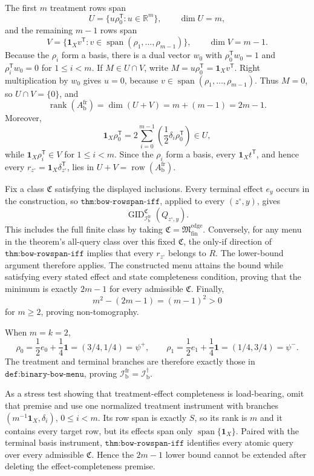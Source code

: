 The first \(m\) treatment rows span
\[
U=\{u\rho_0^{\mathsf T}:u\in\mathbb R^m\},
\qquad \dim U=m,
\]
and the remaining \(m-1\) rows span
\[
V=\{\mathbf 1_Xv^{\mathsf T}:v\in\operatorname{span}(\rho_1,\ldots,\rho_{m-1})\},
\qquad \dim V=m-1.
\]
Because the \(\rho_i\) form a basis, there is a dual vector \(w_0\) with \(\rho_0^{\mathsf T}w_0=1\) and \(\rho_i^{\mathsf T}w_0=0\) for \(1\leq i<m\).  If \(M\in U\cap V\), write \(M=u\rho_0^{\mathsf T}=\mathbf 1_Xv^{\mathsf T}\).  Right multiplication by \(w_0\) gives \(u=0\), because \(v\in\operatorname{span}(\rho_1,\ldots,\rho_{m-1})\).  Thus \(M=0\), so \(U\cap V=\{0\}\), and
\[
\operatorname{rank}(A_{\mathrm b}^{\mathrm{fr}})
=\dim(U+V)=m+(m-1)=2m-1.
\]
Moreover,
\[
\mathbf 1_X\rho_0^{\mathsf T}
=2\sum_{i=0}^{m-1}\left(\frac12\delta_i\rho_0^{\mathsf T}\right)\in U,
\]
while \(\mathbf 1_X\rho_i^{\mathsf T}\in V\) for \(1\leq i<m\).  Since the \(\rho_i\) form a basis, every \(\mathbf 1_Xt^{\mathsf T}\), and hence every \(r_{z^{\circ}}=\mathbf 1_X\delta_{z^{\circ}}^{\mathsf T}\), lies in \(U+V=\operatorname{row}(A_{\mathrm b}^{\mathrm{fr}})\).

Fix a class \(\mathfrak C\) satisfying the displayed inclusions.  Every terminal effect \(e_y\) occurs in the construction, so \(\texttt{thm:bow-rowspan-iff}\), applied to every \((z^{\circ},y)\), gives
\[
\operatorname{GID}_{\mathcal I_{\mathrm b}^{\mathrm{fr}}}^{\mathfrak C}(Q_{z^{\circ},y}).
\]
This includes the full finite class by taking \(\mathfrak C=\mathfrak M_{\mathrm{fin}}^{\mathrm{edge}}\).  Conversely, for any menu in the theorem's all-query class over this fixed \(\mathfrak C\), the only-if direction of \(\texttt{thm:bow-rowspan-iff}\) implies that every \(r_{z^{\circ}}\) belongs to \(R\).  The lower-bound argument therefore applies.  The constructed menu attains the bound while satisfying every stated effect and state completeness condition, proving that the minimum is exactly \(2m-1\) for every admissible \(\mathfrak C\).  Finally,
\[
m^2-(2m-1)=(m-1)^2>0
\]
for \(m\geq2\), proving non-tomography.

When \(m=k=2\),
\[
\rho_0=\frac12e_0+\frac14\mathbf 1=(3/4,1/4)=\psi^+,
\qquad
\rho_1=\frac12e_1+\frac14\mathbf 1=(1/4,3/4)=\psi^-.
\]
The treatment and terminal branches are therefore exactly those in \(\texttt{def:binary-bow-menu}\), proving \(\mathcal I_{\mathrm b}^{\mathrm{fr}}=\mathcal I_{\mathrm b}^{\dagger}\).

As a stress test showing that treatment-effect completeness is load-bearing, omit that premise and use one normalized treatment instrument with branches \((m^{-1}\mathbf 1_X,\delta_i)\), \(0\leq i<m\).  Its row span is exactly \(S\), so its rank is \(m\) and it contains every target row, but its effects span only \(\operatorname{span}\{\mathbf 1_X\}\).  Paired with the terminal basis instrument, \(\texttt{thm:bow-rowspan-iff}\) identifies every atomic query over every admissible \(\mathfrak C\).  Hence the \(2m-1\) lower bound cannot be extended after deleting the effect-completeness premise.